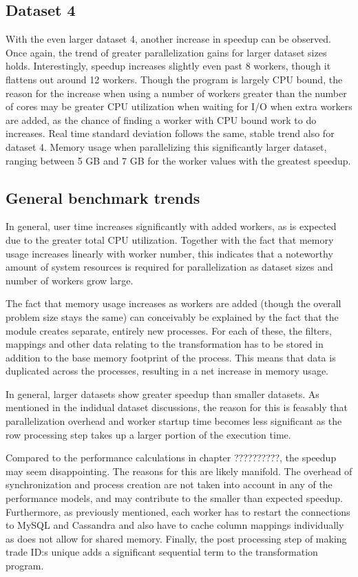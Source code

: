\subsection{Dataset 4}
With the even larger dataset 4, another increase in speedup can be observed. Once again, the trend of greater parallelization gains for larger
dataset sizes holds. Interestingly, speedup increases slightly even past 8 workers, though it flattens out around 12 workers.
Though the program is largely CPU bound, the reason for the increase when using a number of workers greater than the number of cores may be
greater CPU utilization when waiting for I/O when extra workers are added, as the chance of finding a worker with CPU bound work to do increases. 
Real time standard deviation follows the same, stable trend also for dataset 4. Memory usage when parallelizing this significantly larger dataset,
ranging between 5 GB and 7 GB for the worker values with the greatest speedup.

\subsection{General benchmark trends}
In general, user time increases significantly with added workers, as is expected due to the greater total CPU utilization. Together with the
fact that memory usage increases linearly with worker number, this indicates that a noteworthy amount of system resources is required 
for parallelization as dataset sizes and number of workers grow large.

The fact that memory usage increases as workers are added (though the overall problem size stays the same)
can conceivably be explained by the fact that the  module creates separate, entirely
new processes. For each of these, the filters, mappings and other data relating to the transformation has to be stored in addition to the
base memory footprint of the process. This means that data is duplicated across the processes, resulting in a net increase in memory usage.

In general, larger datasets show greater speedup than smaller datasets. As mentioned in the indidual dataset discussions, the reason for this
is feasably that parallelization overhead and worker startup time becomes less significant as the row processing step takes up a larger portion
of the execution time.

Compared to the performance calculations in chapter ??????????, the speedup may seem disappointing. The reasons for this are likely
manifold. The overhead of synchronization and  process creation are not taken into account in any of the performance models,
and may contribute to the smaller than expected speedup. Furthermore, as previously mentioned, each worker has to restart the connections to MySQL
and Cassandra and also have to cache column mappings individually as  does not allow for shared memory. Finally, the
post processing step of making trade ID:s unique adds a significant sequential term to the transformation program.

